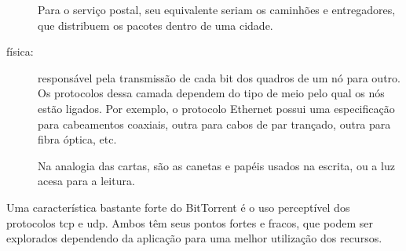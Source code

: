 \begin{description}
        Para o serviço postal, seu equivalente seriam os caminhões e entregadores, que
        distribuem os pacotes dentro de uma cidade.

    \item[física:] responsável pela transmissão de cada bit dos quadros de um nó para
        outro. Os protocolos dessa camada dependem do tipo de meio pelo qual os nós
        estão ligados. Por exemplo, o protocolo Ethernet possui uma especificação para
        cabeamentos coaxiais, outra para cabos de par trançado, outra para fibra óptica,
        etc.

        Na analogia das cartas, são as canetas e papéis usados na escrita, ou a luz
        acesa para a leitura.
\end{description}

Uma característica bastante forte do BitTorrent é o uso perceptível dos protocolos
\gls*{tcp} e \gls*{udp}. Ambos têm seus pontos fortes e fracos, que podem ser explorados
dependendo da aplicação para uma melhor utilização dos recursos.

\begin{comment}
Aqui vou explicar o que são os protocolos de rede TCP e UDP, apontar suas diferenças e
mostrar os motivos pelos quais o UDP é preferido ao TCP no uso de endereços de
\gls*{announce} de \glspl*{tracker}.
\end{comment}



